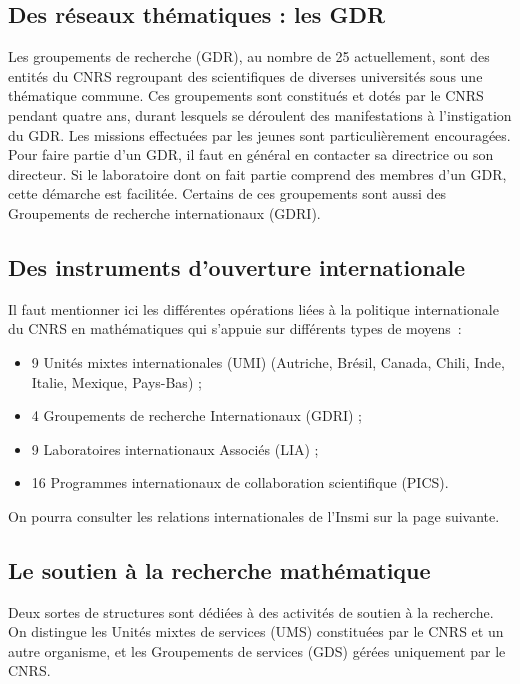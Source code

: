 \subsection{Des r\'eseaux th\'ematiques : les GDR} Les groupements de recherche
(GDR), au nombre de 25 actuellement, sont des entit\'es du CNRS
regroupant des scientifiques de diverses universit\'es sous une
th\'ematique commune. Ces groupements sont constitu\'es et dot\'es
par le CNRS pendant quatre ans, durant lesquels se d\'eroulent des
manifestations \`a l'instigation du GDR. Les missions effectu\'ees par
les jeunes sont particuli\`erement encourag\'ees. Pour faire partie
d'un GDR, il faut en g\'en\'eral en contacter sa directrice ou son directeur. Si le
laboratoire dont on fait partie comprend des membres d'un GDR, cette
d\'emarche est facilit\'ee. Certains de ces groupements sont aussi des
Groupements de recherche internationaux (GDRI).

\subsection{Des instruments d'ouverture internationale}

Il faut mentionner ici les diff\'erentes op\'erations li\'ees \`a la
politique internationale du CNRS en ma\-th\'e\-ma\-tiques qui
s'appuie sur diff\'erents types de moyens~:
\begin{itemize}
\item 9 Unit\'es mixtes internationales (UMI) (Autriche, Br\'esil, Canada, Chili, Inde, Italie, Mexique, Pays-Bas) ;
\item 4 Groupements de recherche  Internationaux (GDRI) ;
\item 9 Laboratoires internationaux Associ\'es (LIA) ;
\item 16 Programmes internationaux de collaboration scientifique  (PICS).
\end{itemize}

On pourra consulter les relations internationales de l'Insmi sur la page suivante.\\



\subsection{Le soutien \`a la recherche math\'ematique}

Deux sortes de structures sont d\'edi\'ees \`a des activit\'es de soutien \`a la recherche. 
On distingue les Unit\'es mixtes de services (UMS)
constitu\'ees par le CNRS et un autre organisme, et les Groupements de services (GDS)
g\'er\'ees  uniquement par le CNRS.

